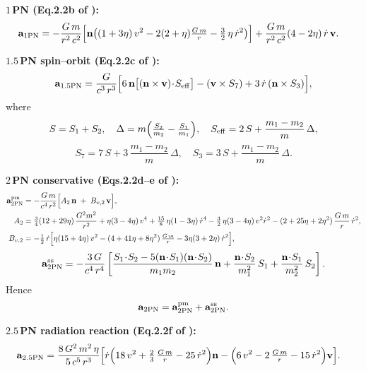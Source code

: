 \documentclass[11pt]{article}
\begin{document}
\medskip
\noindent\textbf{$1$\,PN (Eq.​2.2b of \citealp{Kidder1995}):}
\begin{align}
\mathbf{a}_{1\mathrm{PN}}
&= -\frac{G\,m}{r^2\,c^2}
   \Bigl[
     \mathbf{n}\bigl((1+3\eta)\,v^2
                   -2(2+\eta)\tfrac{G\,m}{r}
                   -\tfrac{3}{2}\,\eta\,\dot r^2\bigr)
   \Bigr]
   +\frac{G\,m}{r^2\,c^2}(4-2\eta)\,\dot r\,\mathbf{v}.
\end{align}

\medskip
\noindent\textbf{$1.5$\,PN spin–orbit (Eq.​2.2c of \citealp{Kidder1995}):}
\[
  \mathbf{a}_{1.5\mathrm{PN}}
  = \frac{G}{c^3\,r^3}
    \Bigl[
      6\,\mathbf{n}\bigl[(\mathbf{n}\times\mathbf{v})\!\cdot\!S_{\rm eff}\bigr]
     -(\mathbf{v}\times S_{7})
     +3\,\dot r\,(\mathbf{n}\times S_{3})
    \Bigr],
\]
where
\[
  S = S_1 + S_2,\quad
  \Delta = m\Bigl(\tfrac{S_2}{m_2}-\tfrac{S_1}{m_1}\Bigr),\quad
  S_{\rm eff} = 2\,S + \frac{m_1-m_2}{m}\,\Delta,
\]
\[
  S_{7} = 7\,S + 3\,\frac{m_1-m_2}{m}\,\Delta,\quad
  S_{3} = 3\,S + \frac{m_1-m_2}{m}\,\Delta.
\]

\medskip
\noindent\textbf{$2$\,PN conservative (Eqs.​2.2d–e of \citealp{Kidder1995}):}
\begin{align}
\mathbf{a}_{2\mathrm{PN}}^{\rm pm}
&= -\frac{G\,m}{c^4\,r^2}
   \Bigl[A_{2}\,\mathbf{n} \;+\; B_{v,2}\,\mathbf{v}\Bigr],\\
A_{2}
&= \tfrac{3}{4}(12+29\eta)\,\frac{G^2m^2}{r^2}
 +\eta(3-4\eta)\,v^4
 +\tfrac{15}{8}\,\eta(1-3\eta)\,\dot r^4
 -\tfrac{3}{2}\,\eta(3-4\eta)\,v^2\dot r^2
 -(2+25\eta+2\eta^2)\,\frac{G\,m}{r}\,\dot r^2,\\
B_{v,2}
&= -\tfrac{1}{2}\,\dot r
   \Bigl[\eta(15+4\eta)\,v^2
         -(4+41\eta+8\eta^2)\,\tfrac{G\,m}{r}
         -3\eta(3+2\eta)\,\dot r^2\Bigr],
\end{align}
\[
  \mathbf{a}_{2\mathrm{PN}}^{\rm ss}
  = -\frac{3\,G}{c^4\,r^4}
    \left[
      \frac{S_1\!\cdot\!S_2-5(\mathbf{n}\!\cdot\!S_1)(\mathbf{n}\!\cdot\!S_2)}{m_1 m_2}\,\mathbf{n}
     +\frac{\mathbf{n}\!\cdot\!S_2}{m_1^2}\,S_1
     +\frac{\mathbf{n}\!\cdot\!S_1}{m_2^2}\,S_2
    \right].
\]
Hence
\[
  \mathbf{a}_{2\mathrm{PN}}
  = \mathbf{a}_{2\mathrm{PN}}^{\rm pm}
  +\mathbf{a}_{2\mathrm{PN}}^{\rm ss}.
\]

\medskip
\noindent\textbf{$2.5$\,PN radiation reaction (Eq.​2.2f of \citealp{Kidder1995}):}
\begin{align}
\mathbf{a}_{2.5\mathrm{PN}}
&= \frac{8\,G^2\,m^2\,\eta}{5\,c^5\,r^3}
   \Bigl[
     \dot r\Bigl(18\,v^2 + \tfrac{2}{3}\,\tfrac{G\,m}{r} - 25\,\dot r^2\Bigr)\mathbf{n}
    -\Bigl(6\,v^2 - 2\,\tfrac{G\,m}{r} - 15\,\dot r^2\Bigr)\mathbf{v}
   \Bigr].
\end{align}
\end{document}
